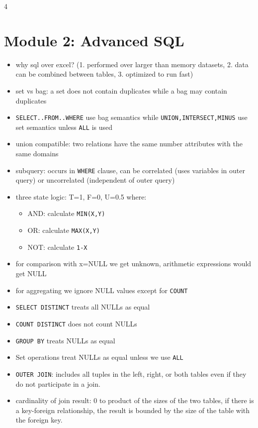 \documentclass[8pt,landscape]{article}
\begin{document}
\begin{multicols*}{4}
    \section*{Module 2: Advanced SQL}
		\begin{itemize}[leftmargin=*]
      \item why sql over excel? (1. performed over larger than memory datasets, 2. data can be combined between tables, 3. optimized to run fast)
      \item set vs bag: a set does not contain duplicates while a bag may contain duplicates
      \item \texttt{SELECT..FROM..WHERE} use bag semantics while \texttt{UNION,INTERSECT,MINUS} use set semantics unless \texttt{ALL} is used
      \item union compatible: two relations have the same number attributes with the same domains
      \item subquery: occurs in \texttt{WHERE} clause, can be correlated (uses variables in outer query) or uncorrelated (independent of outer query)
      \item three state logic: T=1, F=0, U=0.5 where:
        \begin{itemize}
          \item AND: calculate \texttt{MIN(X,Y)}
          \item OR: calculate \texttt{MAX(X,Y)}
          \item NOT: calculate \texttt{1-X}
        \end{itemize}
          \item for comparison with x=NULL we get unknown, arithmetic expressions would get NULL
          \item for aggregating we ignore NULL values except for \texttt{COUNT}
          \item \texttt{SELECT DISTINCT} treats all NULLs as equal
          \item \texttt{COUNT DISTINCT} does not count NULLs
          \item \texttt{GROUP BY} treats NULLs as equal
          \item Set operations treat NULLs as equal unless we use \texttt{ALL}
          \item \texttt{OUTER JOIN}: includes all tuples in the left, right, or both tables even if they do not participate in a join.
          \item cardinality of join result: 0 to product of the sizes of the two tables, if there is a key-foreign relationship, the result is bounded by the size of the table with the foreign key.

\end{itemize}
\end{multicols*}
\end{document}
